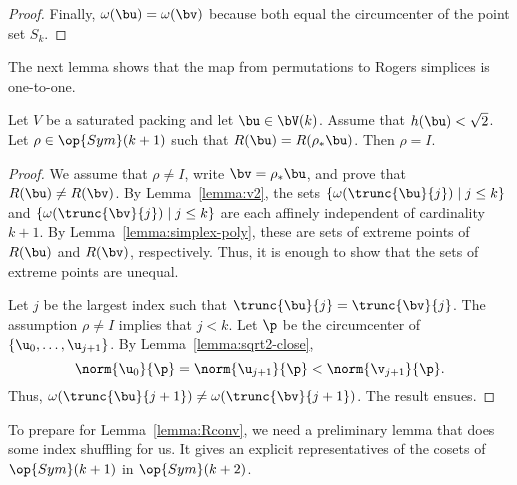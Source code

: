 \begin{proof}
Finally, $\omega(\bu) = \omega(\bv)$ because both equal the
circumcenter of the point set $S_k$.
%
\end{proof}

The next lemma shows that the map from permutations to Rogers
simplices is one-to-one.

\begin{lemma} 
  Let $V$ be a saturated packing and let $\bu\in \bV(k)$.  Assume that
  $h(\bu)<\sqrt2$.  Let $\rho\in\op{Sym}(k+1)$ such that $R(\bu)=
  R(\rho_*\bu)$.  Then $\rho= I$.
\end{lemma}

\begin{proof} 
  We assume that $\rho\ne I$, write $\bv = \rho_*\bu$,  and prove that
  $R(\bu)\ne R(\bv)$.
  By Lemma~\ref{lemma:v2}, the sets
  $\{\omega(\trunc{\bu}{j})\mid j\le k\}$ and
  $\{\omega(\trunc{\bv}{j})\mid j\le k\}$ are each affinely
  independent of cardinality $k+1$.  By
  Lemma~\ref{lemma:simplex-poly}, these are  sets of extreme
  points of $R(\bu)$ and $R(\bv)$, respectively.  Thus, it is enough
  to show that the sets of extreme points are unequal.

  Let $j$ be the largest index such that
  $\trunc{\bu}{j}=\trunc{\bv}{j}$.  The assumption $\rho\ne I$ implies
  that $j<k$.  Let $\p$ be the circumcenter of
  $\{\u_0,\ldots,\u_{j+1}\}$.  By Lemma~\ref{lemma:sqrt2-close},
\[  
\norm{\u_0}{\p} = \norm{\u_{j+1}}{\p} < \norm{\v_{j+1}}{\p}.
\] 
Thus, $\omega(\trunc{\bu}{j+1}) \ne \omega(\trunc{\bv}{j+1})$.  The result ensues.
\end{proof}

To prepare for Lemma~\ref{lemma:Rconv}, we need a preliminary lemma
that does some index shuffling for us.  It gives an explicit
representatives of the cosets of $\op{Sym}(k+1)$ in $\op{Sym}(k+2)$.


